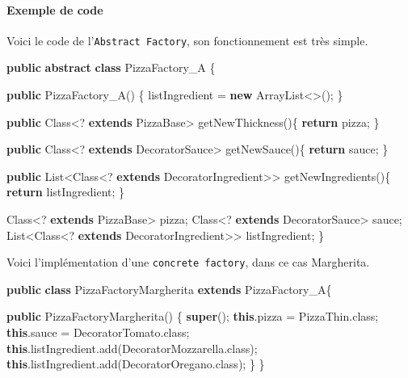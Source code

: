 \documentclass[french,]{article}
\newenvironment{Shaded}{}{}
\newcommand{\KeywordTok}[1]{\textcolor[rgb]{0.00,0.44,0.13}{\textbf{{#1}}}}
\newcommand{\FunctionTok}[1]{\textcolor[rgb]{0.02,0.16,0.49}{{#1}}}
\newcommand{\NormalTok}[1]{{#1}}
\let\oldparagraph\paragraph
\renewcommand{\paragraph}[1]{\oldparagraph{#1}\mbox{}}
\begin{document}
\paragraph{Exemple de code}\label{exemple-de-code}

Voici le code de l'\texttt{Abstract\ Factory}, son fonctionnement est
très simple.

\begin{Shaded}
\begin{Highlighting}[]
\KeywordTok{public} \KeywordTok{abstract} \KeywordTok{class} \NormalTok{PizzaFactory_A \{}

 \KeywordTok{public} \FunctionTok{PizzaFactory_A}\NormalTok{() \{}
  \NormalTok{listIngredient = }\KeywordTok{new} \NormalTok{ArrayList<>();}
 \NormalTok{\}}

 \KeywordTok{public} \NormalTok{Class<? }\KeywordTok{extends} \NormalTok{PizzaBase> }\FunctionTok{getNewThickness}\NormalTok{()\{}
  \KeywordTok{return} \NormalTok{pizza;}
 \NormalTok{\}}

 \KeywordTok{public} \NormalTok{Class<? }\KeywordTok{extends} \NormalTok{DecoratorSauce> }\FunctionTok{getNewSauce}\NormalTok{()\{}
  \KeywordTok{return} \NormalTok{sauce;}
 \NormalTok{\}}

 \KeywordTok{public} \NormalTok{List<Class<? }\KeywordTok{extends} \NormalTok{DecoratorIngredient>> }\FunctionTok{getNewIngredients}\NormalTok{()\{}
  \KeywordTok{return} \NormalTok{listIngredient;}
 \NormalTok{\}}

 \NormalTok{Class<? }\KeywordTok{extends} \NormalTok{PizzaBase> pizza;}
 \NormalTok{Class<? }\KeywordTok{extends} \NormalTok{DecoratorSauce> sauce;}
 \NormalTok{List<Class<? }\KeywordTok{extends} \NormalTok{DecoratorIngredient>> listIngredient;}
\NormalTok{\}}
\end{Highlighting}
\end{Shaded}

Voici l'implémentation d'une \texttt{concrete\ factory}, dans ce cas
Margherita.

\begin{Shaded}
\begin{Highlighting}[]
\KeywordTok{public} \KeywordTok{class} \NormalTok{PizzaFactoryMargherita }\KeywordTok{extends} \NormalTok{PizzaFactory_A\{}

 \KeywordTok{public} \FunctionTok{PizzaFactoryMargherita}\NormalTok{() \{}
  \KeywordTok{super}\NormalTok{();}
  \KeywordTok{this}\NormalTok{.}\FunctionTok{pizza} \NormalTok{= PizzaThin.}\FunctionTok{class}\NormalTok{;}
  \KeywordTok{this}\NormalTok{.}\FunctionTok{sauce} \NormalTok{= DecoratorTomato.}\FunctionTok{class}\NormalTok{;}
  \KeywordTok{this}\NormalTok{.}\FunctionTok{listIngredient}\NormalTok{.}\FunctionTok{add}\NormalTok{(DecoratorMozzarella.}\FunctionTok{class}\NormalTok{);}
  \KeywordTok{this}\NormalTok{.}\FunctionTok{listIngredient}\NormalTok{.}\FunctionTok{add}\NormalTok{(DecoratorOregano.}\FunctionTok{class}\NormalTok{);}
 \NormalTok{\}}
\NormalTok{\}}
\end{Highlighting}
\end{Shaded}
\end{document}
